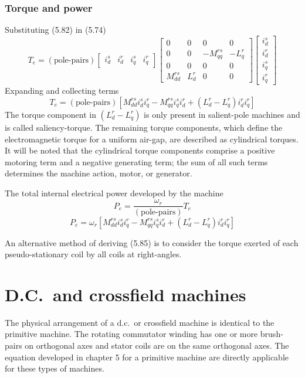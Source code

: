 \documentclass[a4paper,numbers=noenddot,12pt]{scrbook}
\begin{document}
\subsection{Torque and power}

Substituting (5.82) in (5.74)
\begin{equation}
    T_e = (\text{pole-pairs})
    \begin{bmatrix}
        i_d^s & i_d^r &i_q^s & i_q^r
    \end{bmatrix}
    \begin{bmatrix}
        0 & 0 & 0 & 0 \\
        0 & 0 & -M_{qq}^{rs} & -L_q^r \\
        0 & 0 & 0 & 0 \\
        M_{dd}^{rs} & L_d^r & 0 & 0 
    \end{bmatrix}
    \begin{bmatrix}
        i_d^s \\  i_d^r \\ i_q^s \\ i_q^r
    \end{bmatrix}
\end{equation}
Expanding and collecting terms
\begin{equation}
    T_e = (\text{pole-pairs}) [M_{dd}^{rs} i_d^s i_q^r - M_{qq}^{rs} i_q^s i_d^r + (L_d^r  - L_q^r)i_d^r i_q^r]
\end{equation}
The torque component in $(L_d^r - L_q^r)$ is only present in salient-pole machines and is called saliency-torque. The remaining torque components, which define the electromagnetic torque for a uniform air-gap, are described as cylindrical torques. It will be noted that the cylindrical torque components comprise a positive motoring term and a negative generating term; the sum of all such terms determines the machine action, motor, or generator.

The total internal electrical power developed by the machine
\begin{equation}
    P_e = \frac{\omega_r}{(\text{pole-pairs})} T_e
\end{equation}
\begin{equation}
    P_e = \omega_r [M_{dd}^{rs} i_d^s i_q^r - M_{qq}^{rs} i_q^s i_d^r + (L_d^r  - L_q^r)i_d^r i_q^r]
\end{equation}

An alternative method of deriving (5.85) is to consider the torque exerted of each pseudo-stationary coil by all coils at right-angles.
\chapter{D.C.\ and crossfield machines}
The physical arrangement of a d.c.\ or crossfield machine is identical to the primitive machine. The rotating commutator winding has one or more brush-pairs on orthogonal axes and stator coils are on the same orthogonal axes. The equation developed in chapter 5 for a primitive machine are directly applicable for these types of machines.
\end{document}
